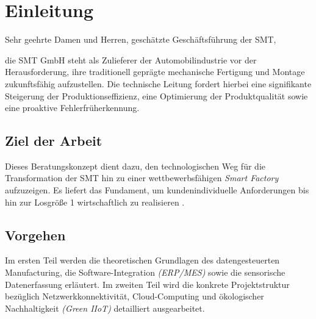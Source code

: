 
\chapter{Einleitung}
\label{chap:einleitung}
\thispagestyle{fancy}

Sehr geehrte Damen und Herren, geschätzte Geschäftsführung der \acs{SMT},

die \acs{SMT} \acs{GmbH} steht als Zulieferer der Automobilindustrie vor der Herausforderung, ihre traditionell geprägte mechanische Fertigung und Montage zukunftsfähig aufzustellen. Die technische Leitung fordert hierbei eine signifikante Steigerung der Produktionseffizienz, eine Optimierung der Produktqualität sowie eine proaktive Fehlerfrüherkennung.

\section*{Ziel der Arbeit}
Dieses Beratungskonzept dient dazu, den technologischen Weg für die Transformation der \acs{SMT} hin zu einer wettbewerbsfähigen \textit{Smart Factory} aufzuzeigen. Es liefert das Fundament, um kundenindividuelle Anforderungen bis hin zur Losgröße 1 wirtschaftlich zu realisieren \cite[11]{1}.

\section*{Vorgehen}
Im ersten Teil werden die theoretischen Grundlagen des datengesteuerten Manufacturing, die Software-Integration \textit{(\acs{ERP}/\acs{MES})} sowie die sensorische Datenerfassung erläutert. Im zweiten Teil wird die konkrete Projektstruktur bezüglich Netzwerkkonnektivität, Cloud-Computing und ökologischer Nachhaltigkeit \textit{(\glqq Green \acs{IIoT}\grqq)} detailliert ausgearbeitet.

